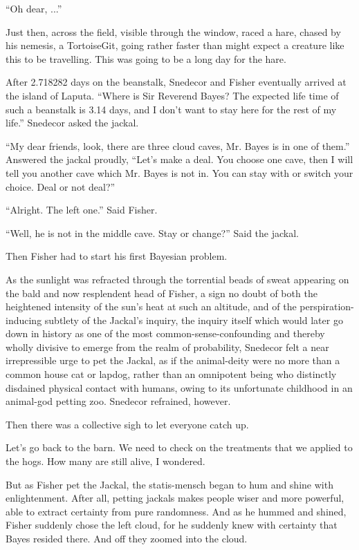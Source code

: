 \documentclass{article}
\begin{document}
``Oh dear, ...''

Just then, across the field, visible through the window, raced a hare, chased by his nemesis, a TortoiseGit, going rather faster than might expect a creature like this to be travelling. This was going to be a long day for the hare.

After 2.718282 days on the beanstalk, Snedecor and Fisher eventually arrived at the island of Laputa. 
``Where is Sir Reverend Bayes? The expected life time of such a beanstalk is 3.14 days, 
and I don't want to stay here for the rest of my life.'' Snedecor asked the jackal.

``My dear friends, look, there are three cloud caves, Mr. Bayes is in one of them.'' Answered the jackal proudly,
``Let's make a deal. You choose one cave, then I will tell you another cave which Mr. Bayes is not in.
You can stay with or switch your choice. Deal or not deal?''

``Alright. The left one.'' Said Fisher.

``Well, he is not in the middle cave. Stay or change?'' Said the jackal.

Then Fisher had to start his first Bayesian problem.

As the sunlight was refracted through the torrential beads of sweat appearing on the bald and now resplendent head of Fisher, a sign no doubt of both the heightened intensity of the sun's heat at such an altitude, and of the perspiration-inducing subtlety of the Jackal's inquiry, the inquiry itself which would later go down in history as one of the most common-sense-confounding and thereby wholly divisive to emerge from the realm of probability, Snedecor felt a near irrepressible urge to pet the Jackal, as if the animal-deity were no more than a common house cat or lapdog, rather than an omnipotent being who distinctly disdained physical contact with humans, owing to its unfortunate childhood in an animal-god petting zoo.  Snedecor refrained, however.

Then there was a collective sigh to let everyone catch up.

Let's go back to the barn.  We need to check on the treatments that we applied to the hogs.  How many are still alive, I wondered.

But as Fisher pet the Jackal, the statis-mensch began to hum and shine with enlightenment. After all, petting jackals makes people wiser and more powerful, able to extract certainty from pure randomness. And as he hummed and shined, Fisher suddenly chose the left cloud, for he suddenly knew with certainty that Bayes resided there. And off they zoomed into the cloud. 
\end{document}

